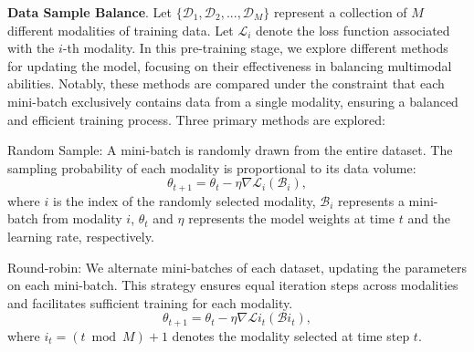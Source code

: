 

\textbf{Data Sample Balance}.
Let $\{\mathcal{D}_1, \mathcal{D}_2, ..., \mathcal{D}_M\}$ represent a collection of  $M$ different modalities of training data. Let $\mathcal{L}_i$ denote the loss function associated with the $i$-th modality.  In this pre-training stage, we explore different methods for updating the model, focusing on their effectiveness in balancing multimodal abilities. Notably, these methods are compared under the constraint that each mini-batch exclusively contains data from a single modality, ensuring a balanced and efficient training process. Three primary methods are explored:

Random Sample: A mini-batch is randomly drawn from the entire dataset. The sampling probability of each modality is proportional to its data volume:
\begin{equation}\label{random_sample}
    \theta_{t+1} = \theta_t - \eta \nabla \mathcal{L}_i(\mathcal{B}_i),
\end{equation}
where $i$ is the index of the randomly selected modality, $\mathcal{B}_i$ represents a mini-batch from modality $i$,  $\theta_t$ and $\eta$ represents the model weights at time $t$ and the learning rate, respectively.


Round-robin: We alternate mini-batches of each dataset, updating the parameters on each mini-batch. This strategy ensures equal iteration steps across modalities and facilitates sufficient training for each modality.
\begin{equation}\label{round_robin}
    \theta_{t+1} = \theta_t - \eta \nabla \mathcal{L}{i_t}(\mathcal{B}{i_t}),
\end{equation}
where  $i_t = (t \bmod M) + 1$ denotes the modality selected at time step $t$.

